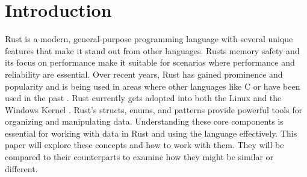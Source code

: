 \section{Introduction}
\noindent Rust is a modern, general-purpose programming language with several unique features that make it stand out from other languages.
Rusts memory safety and its focus on performance make it suitable for scenarios where performance and reliability are essential.
Over recent years, Rust has gained prominence and popularity \cite{sosurvey} and is being used in areas where other languages like C or \Cpp have been used in the past \cite{fbrust} \cite{rustchrome} \cite{rustfirefox}.
Rust currently gets adopted into both the Linux \cite{rustlinux} and the Windows Kernel \cite{rustwindows}.
Rust's structs, enums, and patterns provide powerful tools for organizing and manipulating data.
Understanding these core components is essential for working with data in Rust and using the language effectively.
This paper will explore these concepts and how to work with them.
They will be compared to their \Cpp counterparts to examine how they might be similar or different.
